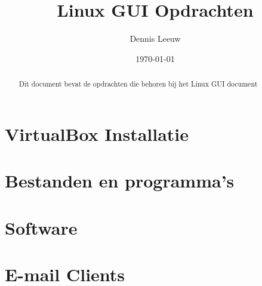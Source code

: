 \documentclass[12pt, a4paper, twoside]{article}
\title{Linux GUI Opdrachten}
\author{Dennis Leeuw}
\date{\today}
\begin{document}
\begin{titlepage}
\maketitle
\end{titlepage}

\begin{abstract}
Dit document bevat de opdrachten die behoren bij het Linux GUI document
\end{abstract}

\section{VirtualBox Installatie}


\section{Bestanden en programma's}


\section{Software}


\section{E-mail Clients}

\end{document}
